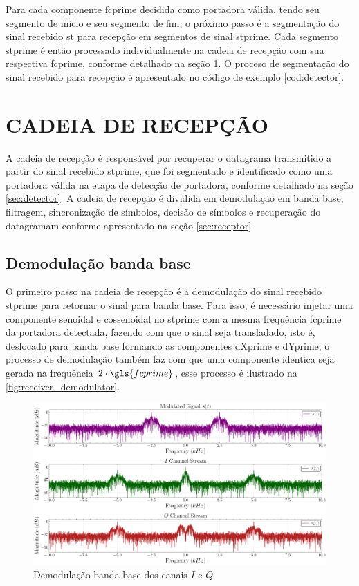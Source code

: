 Para cada componente \gls{fcprime} decidida como portadora válida, tendo seu segmento de inicio e seu segmento de fim, o próximo passo é a segmentação do sinal recebido \gls{st} para recepção em segmentos de sinal \gls{stprime}. Cada segmento \gls{stprime} é então processado individualmente na cadeia de recepção com sua respectiva \gls{fcprime}, conforme detalhado na seção \ref{sec:recepcao}. O proceso de segmentação do sinal recebido para recepção é apresentado no código de exemplo \ref{cod:detector}.



\section{CADEIA DE RECEPÇÃO}\label{sec:recepcao}    

A cadeia de recepção é responsável por recuperar o datagrama transmitido a partir do sinal recebido \gls{stprime}, que foi segmentado e identificado como uma portadora válida na etapa de detecção de portadora, conforme detalhado na seção \ref{sec:detector}. A cadeia de recepção é dividida em demodulação em banda base, filtragem, sincronização de símbolos, decisão de símbolos e recuperação do datagramam conforme apresentado na seção \ref{sec:receptor}

\subsection{Demodulação banda base}\label{sec:demodulacao}

O primeiro passo na cadeia de recepção é a demodulação do sinal recebido \gls{stprime} para retornar o sinal para banda base. Para isso, é necessário injetar uma componente senoidal e cossenoidal no \gls{stprime} com a mesma frequência \gls{fcprime} da portadora detectada, fazendo com que o sinal seja transladado, isto é, deslocado para banda base formando as componentes \gls{dXprime} e \gls{dYprime}, o processo de demodulação também faz com que uma componente identica seja gerada na frequência $2 \cdot \gls{fcprime}$, esse processo é ilustrado na \autoref{fig:receiver_demodulator}.

\begin{figure}[H]
	\centering
	\caption{Demodulação banda base dos canais $I$ e $Q$}\label{fig:receiver_demodulator}
	\includegraphics[width=\linewidth]{assets/cap3/receiver_demodulator_freq.pdf}
\end{figure}


